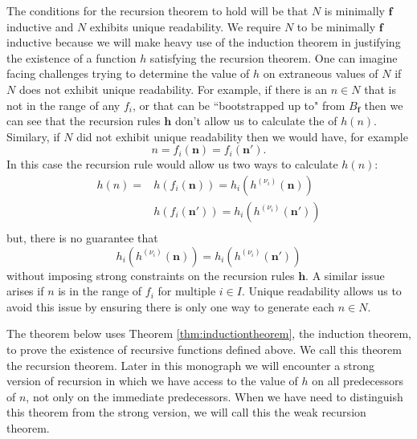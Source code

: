 \documentclass[oneside, 12pt]{book}
\theoremstyle{break}
\newtheorem{preformal definition}[definition]{Preformal Definition}
\newtheorem{preformal theorem}[theorem]{Preformal Theorem}
\newcommand{\bv}[1]{\boldsymbol{#1}}
\newcommand{\qq}[1]{``#1"}
\begin{document}
			The conditions for the recursion theorem to hold will be that $N$ is minimally $\bv{f}$ inductive and $N$ exhibits unique readability.
			We require $N$ to be minimally $\bv{f}$ inductive because we will make heavy use of the induction theorem in justifying the existence of a function $h$ satisfying the recursion theorem.
			One can imagine facing challenges trying to determine the value of $h$ on extraneous values of $N$ if $N$ does not exhibit unique readability.
			For example, if there is an $n\in N$ that is not in the range of any $f_i$, or that can be \qq{bootstrapped up to} from $B_{\bv{f}}$ then we can see that the recursion rules $\bv{h}$ don't allow us to calculate the of $h(n)$.
			Similary, if $N$ did not exhibit unique readability then we would have, for example
			\begin{equation*}
				n = f_i(\bv{n}) = f_i(\bv{n}').
			\end{equation*}
			In this case the recursion rule would allow us two ways to calculate $h(n)$:
			\begin{align*}
				h(n) =& h(f_i(\bv{n})) = h_i(h^{(\nu_i)}(\bv{n}))\\
				 &h(f_i(\bv{n}')) = h_i(h^{(\nu_i)}(\bv{n}'))\\
			\end{align*}
			but, there is no guarantee that
			\begin{equation*}
				h_i(h^{(\nu_i)}(\bv{n})) = h_i(h^{(\nu_i)}(\bv{n}'))
			\end{equation*}
			without imposing strong constraints on the recursion rules $\bv{h}$.
			A similar issue arises if $n$ is in the range of $f_i$ for multiple $i\in I$.
			Unique readability allows us to avoid this issue by ensuring there is only one way to generate each $n\in N$.
			
			The theorem below uses Theorem \ref{thm:inductiontheorem}, the induction theorem, to prove the existence of recursive functions defined above.
			We call this theorem the recursion theorem.
			Later in this monograph we will encounter a strong version of recursion in which we have access to the value of $h$ on all predecessors of $n$, not only on the immediate predecessors.
			When we have need to distinguish this theorem from the strong version, we will call this the weak recursion theorem.
			
\end{document}
